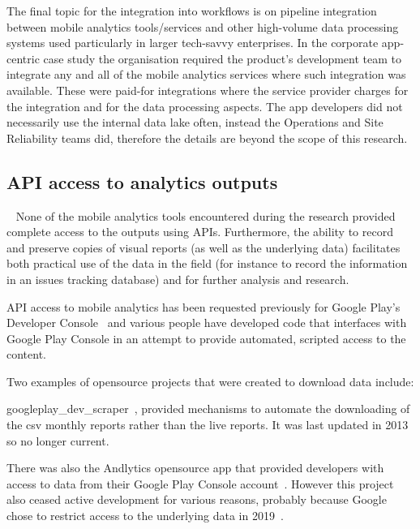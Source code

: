 The final topic for the integration into workflows is on pipeline integration between mobile analytics tools/services and other high-volume data processing systems used particularly in larger tech-savvy enterprises. In the corporate app-centric case study the organisation required the product's development team to integrate any and all of the mobile analytics services where such integration was available. These were paid-for integrations where the service provider charges for the integration and for the data processing aspects. The app developers did not necessarily use the internal data lake often, instead the Operations and Site Reliability teams did, therefore the details are beyond the scope of this research.

\subsection{API access to analytics outputs}~\label{tata-api-access-to-analytics-outputs-topic}
None of the mobile analytics tools encountered during the research provided complete access to the outputs using APIs. Furthermore, the ability to record and preserve copies of visual reports (as well as the underlying data) facilitates both practical use of the data in the field (for instance to record the information in an issues tracking database) and for further analysis and research. 

API access to mobile analytics has been requested previously for Google Play's Developer Console~ and various people have developed code that interfaces with Google Play Console in an attempt to provide automated, scripted access to the content.

\begin{kaobox}[frametitle=Opensource projects to download data from Google Play Console]
Two examples of opensource projects that were created to download data include:

googleplay\_dev\_scraper~, provided mechanisms to automate the downloading of the \Gls{csv} monthly reports rather than the live reports. It was last updated in 2013 so no longer current. 

There was also the Andlytics opensource app that provided developers with access to data from their Google Play Console account~. 
However this project also ceased active development for various reasons, probably because Google chose to restrict access to the underlying data in 2019~. %
\end{kaobox}

